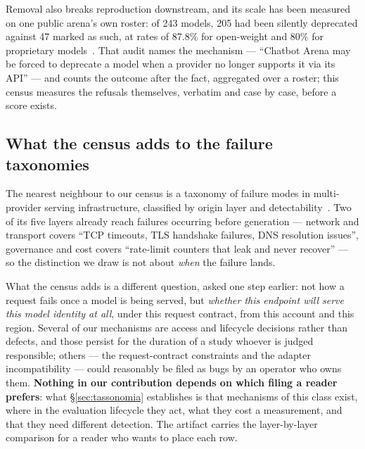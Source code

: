 Removal also breaks reproduction downstream, and its scale has been measured on one public arena's
own roster: of 243 models, 205 had been silently deprecated against 47 marked as such, at rates of
87.8\% for open-weight and 80\% for proprietary models~\citep{leaderboard-illusion}. That audit
names the mechanism --- ``Chatbot Arena may be forced to deprecate a model when a provider no longer
supports it via its API'' --- and counts the outcome after the fact, aggregated over a roster; this census measures the refusals themselves, verbatim and case by case, before a score exists.

\subsection{What the census adds to the failure taxonomies}

The nearest neighbour to our census is a taxonomy of failure modes in multi-provider serving
infrastructure, classified by origin layer and detectability~\citep{failureatlas}. Two of its
five layers already reach failures occurring before generation --- network and transport covers
``TCP timeouts, TLS handshake failures, DNS resolution issues'', governance and cost covers
``rate-limit counters that leak and never recover'' --- so the distinction we draw is not about
\emph{when} the failure lands.

What the census adds is a different question, asked one step earlier: not how a request fails once a
model is being served, but \emph{whether this endpoint will serve this model identity at all}, under this
request contract, from this account and this region. Several of our mechanisms are access and lifecycle
decisions rather than defects, and those persist for the duration of a study whoever is judged
responsible; others --- the request-contract constraints and the adapter incompatibility --- could
reasonably be filed as bugs by an operator who owns them. \textbf{Nothing in our contribution depends on
which filing a reader prefers}: what \S\ref{sec:tassonomia} establishes is that mechanisms of this class
exist, where in the evaluation lifecycle they act, what they cost a measurement, and that they need
different detection. The artifact carries the layer-by-layer comparison for a reader who wants to place
each row.

